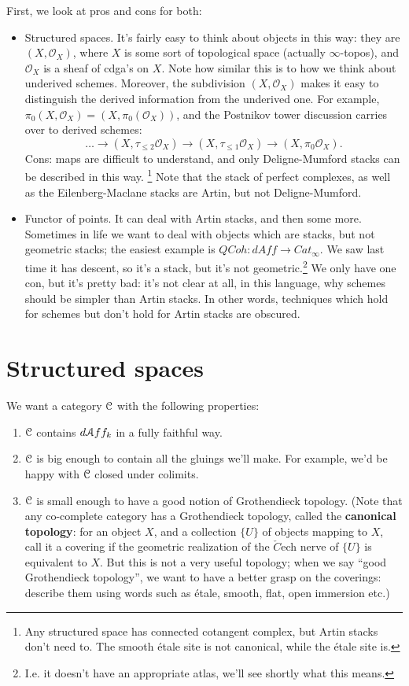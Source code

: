 \documentclass[10pt,a4paper,reqno,oneside]{book} %
\theoremstyle{plain}
\theoremstyle{definition}
\theoremstyle{remark}
\numberwithin{equation}{section}
\begin{document}
First, we look at pros and cons for both:
\begin{itemize}
\item Structured spaces. It's fairly easy to think about objects in this way: they are $(X, \mathcal{O}_X)$, where $X$ is some
sort of topological space (actually $\infty$-topos), and $\mathcal{O}_X$ is a sheaf of cdga's on $X$. Note how similar this is
to how we think about underived schemes. Moreover, the subdivision $(X, \mathcal{O}_X)$ makes it easy to distinguish the
derived information from the underived one. For example, $\pi_0(X,\mathcal{O}_X) = (X, \pi_0(\mathcal{O}_X))$, and the Postnikov
tower discussion carries over to derived schemes:
\[	\dots \to (X, \tau_{\leq 2} \mathcal{O}_X) \to (X, \tau_{\leq 1} \mathcal{O}_X) \to (X, \pi_0 \mathcal{O}_X).	\]
Cons: maps are difficult to understand, and only Deligne-Mumford stacks can be described in this way. 
\footnote{Any structured space has connected cotangent complex, but Artin stacks don't need to. The smooth \'etale
site is not canonical, while the \'etale site is.}
Note that the stack of
perfect complexes, as well as the Eilenberg-Maclane stacks are Artin, but not Deligne-Mumford.

\item Functor of points. It can deal with Artin stacks, and then some more. Sometimes in life we want to deal with objects 
which are stacks,
but not geometric stacks; the easiest example is $QCoh : d Aff \to Cat_{\infty}$. We saw last time it has descent, so it's
a stack, but it's not geometric.\footnote{I.e. it doesn't have an appropriate atlas, we'll see shortly what this means.} 
We only have one con, but it's pretty bad: it's not clear at all,
in this language, why schemes should be simpler than Artin stacks. In other words, techniques which hold for schemes but don't
hold for Artin stacks are obscured.
\end{itemize}


\section{Structured spaces}
We want a category $\mathcal C$ with the following properties:
\begin{enumerate}
\item \label{env1}
$\mathcal C$ contains $d \mathcal A ff_k$ in a fully faithful way.
\item \label{env2}
$\mathcal C$ is big enough to contain all the gluings we'll make. For example, we'd be happy with $\mathcal C$ closed under colimits.
\item \label{env3}
$\mathcal C$ is small enough to have a good notion of Grothendieck topology. (Note that any co-complete category has a Grothendieck
topology, called the \textbf{canonical topology}: for an object $X$, and a collection $\{U\}$ of objects mapping to $X$, 
call it a covering if
the geometric realization of the $\check{C}$ech nerve of $\{U\}$ is equivalent to $X$. But this is not a very useful topology; when
we say ``good Grothendieck topology'', we want to have a better grasp on the coverings: describe them using words such as
\'etale, smooth, flat, open immersion etc.)
\end{enumerate}
\end{document}
